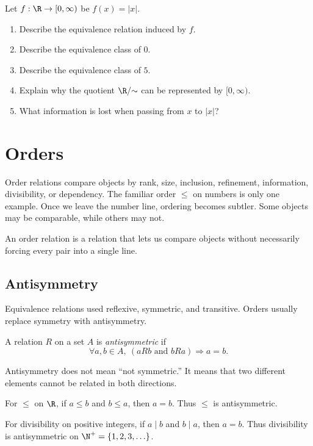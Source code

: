\begin{labbox}
Let $f:\R\to[0,\infty)$ be $f(x)=|x|$.
\begin{enumerate}
\item Describe the equivalence relation induced by $f$.
\item Describe the equivalence class of $0$.
\item Describe the equivalence class of $5$.
\item Explain why the quotient $\R/{\sim}$ can be represented by $[0,\infty)$.
\item What information is lost when passing from $x$ to $|x|$?
\end{enumerate}
\end{labbox}

\newpage
\section{Orders}

Order relations compare objects by rank, size, inclusion, refinement, information, divisibility, or dependency. The familiar order $\leq$ on numbers is only one example. Once we leave the number line, ordering becomes subtler. Some objects may be comparable, while others may not.

\begin{focusbox}
An order relation is a relation that lets us compare objects without necessarily forcing every pair into a single line.
\end{focusbox}

\subsection{Antisymmetry}

Equivalence relations used reflexive, symmetric, and transitive. Orders usually replace symmetry with antisymmetry.

\begin{definition}
A relation $R$ on a set $A$ is \emph{antisymmetric} if
\[
\forall a,b\in A,\ (aRb\text{ and }bRa)\Rightarrow a=b.
\]
\end{definition}

Antisymmetry does not mean ``not symmetric.'' It means that two different elements cannot be related in both directions.

For $\leq$ on $\R$, if $a\leq b$ and $b\leq a$, then $a=b$. Thus $\leq$ is antisymmetric.

For divisibility on positive integers, if $a\mid b$ and $b\mid a$, then $a=b$. Thus divisibility is antisymmetric on $\N^+=\{1,2,3,\ldots\}$.

